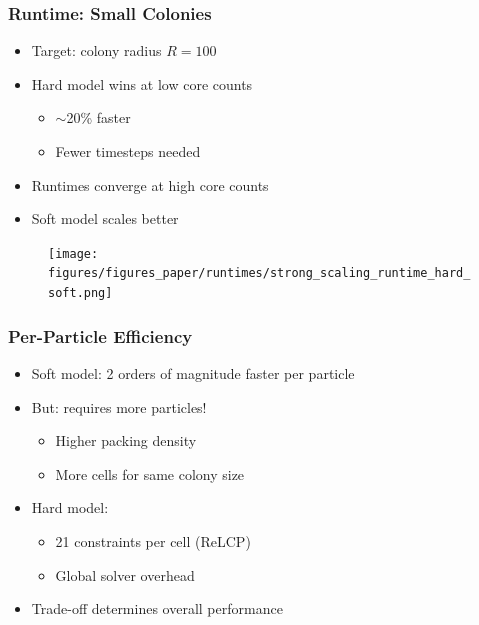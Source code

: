 \documentclass[
	10pt,
	t
]{beamer}
\begin{document}
\begin{frame}
    \frametitle{Runtime: Small Colonies}

    \begin{itemize}
        \item Target: colony radius $R = 100$
        \item Hard model wins at low core counts
              \begin{itemize}
                  \item $\sim$20\% faster
                  \item Fewer timesteps needed
              \end{itemize}
        \item Runtimes converge at high core counts
        \item Soft model scales better
    \end{itemize}

    \vspace{0.2cm}

    \begin{figure}
        \centering
        \texttt{[image: figures/figures\_paper/runtimes/strong\_scaling\_runtime\_hard\_soft.png]}
    \end{figure}

\end{frame}

\begin{frame}
    \frametitle{Per-Particle Efficiency}

    \begin{itemize}
        \item Soft model: 2 orders of magnitude faster per particle
        \item But: requires more particles!
              \begin{itemize}
                  \item Higher packing density
                  \item More cells for same colony size
              \end{itemize}
        \item Hard model:
              \begin{itemize}
                  \item 21 constraints per cell (ReLCP)
                  \item Global solver overhead
              \end{itemize}
        \item Trade-off determines overall performance
    \end{itemize}

\end{frame}
\end{document}
